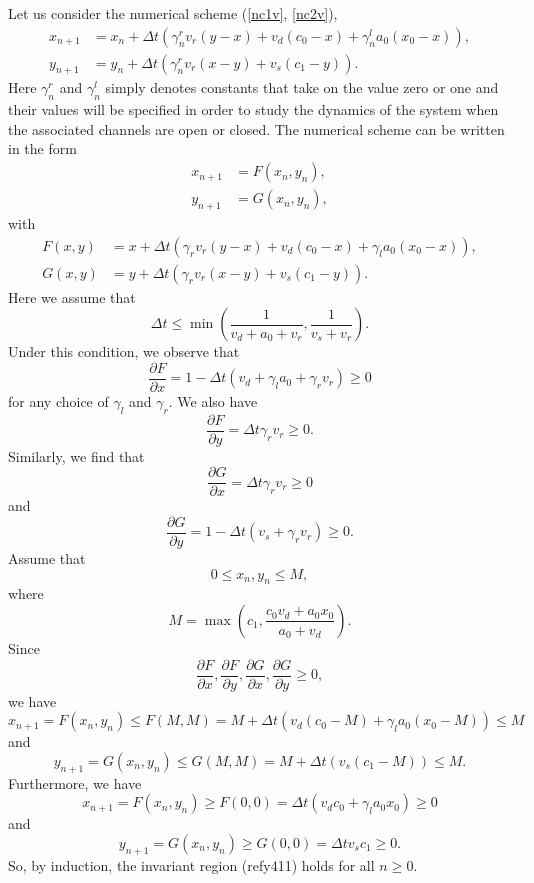 Let us consider the numerical scheme (\ref{nc1v}, \ref{nc2v}),
\begin{align}
x_{n+1}  &  =x_n+\Delta t\left( \gamma_n^{r}v_{r}\left(  y-x\right)  +v_{d}\left(
c_{0}-x\right)  +\gamma_n^{l}a_{0}(x_{0}-x)\right) ,\label{x400}\\
y_{n+1} &  =y_n+\Delta t\left(\gamma_n^{r}v_{r}\left(  x-y\right)  +v_{s}\left(
c_{1}-y\right) \right)  . \label{y400}
\end{align}
Here $\gamma_n^{r}$ and $\gamma_n^{l}$ simply denotes constants that take on the
value zero or one and their values will be specified in order to study the
dynamics of the system when the associated channels are open or closed. The
numerical scheme can be written in the form
\begin{align}
x_{n+1} &  =F\left(  x_{n},y_{n}\right)  ,\label{x401}\\
y_{n+1} &  =G\left(  x_{n},y_{n}\right)  ,\label{y401}
\end{align}
with
\begin{align*}
F(x,y) &  =x+\Delta t\left(  \gamma_{r}v_{r}\left(  y-x\right)  +v_{d}\left(
c_{0}-x\right)  +\gamma_{l}a_{0}(x_{0}-x)\right)  ,\\
G(x,y) &  =y+\Delta t\left(  \gamma_{r}v_{r}\left(  x-y\right)  +v_{s}\left(
c_{1}-y\right)  \right).
\end{align*}
Here we assume that
\begin{equation}
\Delta t\leqslant\min\left(  \frac{1}{v_{d}+a_{0}+v_{r}},\frac{1}{v_{s}+v_{r}
}\right).  \label{dt400}
\end{equation}
Under this condition, we observe that
\[
\frac{\partial F}{\partial x}=1-\Delta t\left(  v_{d}+\gamma_{l}a_{0}
+\gamma_{r}v_{r}\right)  \geqslant0
\]
for any choice of $\gamma_{l}$ and $\gamma_{r}$. We also have
\[
\frac{\partial F}{\partial y}=\Delta t \gamma_{r}v_{r}\geqslant0.
\]
Similarly, we find that
\begin{equation}
\frac{\partial G}{\partial x}=\Delta t \gamma_{r}v_{r}\geqslant0
\end{equation}
and
\begin{equation}
\frac{\partial G}{\partial y}=1-\Delta t\left(  v_{s}+\gamma_{r}v_{r}\right)
\geqslant0.
\end{equation}
Assume that
\begin{equation}
0\leqslant x_{n},y_{n}\leqslant M,\label{y411}
\end{equation}
where
\[
M=\max\left(  c_{1},\frac{c_0 v_d +a_{0}x_{0}}{a_{0}+v_{d}}\right)  .
\]
Since
\[
\frac{\partial F}{\partial x},\frac{\partial F}{\partial y},\frac{\partial
G}{\partial x},\frac{\partial G}{\partial y}\geqslant0,
\]
we have
\[
x_{n+1}=F\left(  x_{n},y_{n}\right)  \leqslant F(M,M)=M+\Delta t\left(
v_{d}\left(  c_{0}-M\right)  +\gamma_{l}a_{0}(x_{0}-M)\right)  \leqslant M
\]
and
\[
y_{n+1}=G\left(  x_{n},y_{n}\right)  \leqslant G(M,M)=M+\Delta t\left(
v_{s}\left(  c_{1}-M\right)  \right)  \leqslant M.
\]
Furthermore, we have
\[
x_{n+1}=F\left(  x_{n},y_{n}\right)  \geqslant F(0,0)=\Delta t\left(
v_{d}c_{0}+\gamma_{l}a_{0}x_{0}\right)  \geqslant0
\]
and
\[
y_{n+1}=G\left(  x_{n},y_{n}\right)  \geqslant G(0,0)=\Delta tv_{s}
c_{1}\geqslant0.
\]
So, by induction, the invariant region (ref{y411}) holds for
all $n\geqslant0.$


